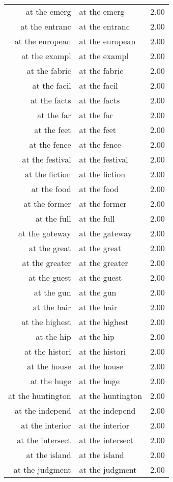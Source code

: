 \begin{table}[ht]
\begin{tabular}{rlr}
  at the emerg & at the emerg & 2.00 \\ 
  at the entranc & at the entranc & 2.00 \\ 
  at the european & at the european & 2.00 \\ 
  at the exampl & at the exampl & 2.00 \\ 
  at the fabric & at the fabric & 2.00 \\ 
  at the facil & at the facil & 2.00 \\ 
  at the facts & at the facts & 2.00 \\ 
  at the far & at the far & 2.00 \\ 
  at the feet & at the feet & 2.00 \\ 
  at the fence & at the fence & 2.00 \\ 
  at the festival & at the festival & 2.00 \\ 
  at the fiction & at the fiction & 2.00 \\ 
  at the food & at the food & 2.00 \\ 
  at the former & at the former & 2.00 \\ 
  at the full & at the full & 2.00 \\ 
  at the gateway & at the gateway & 2.00 \\ 
  at the great & at the great & 2.00 \\ 
  at the greater & at the greater & 2.00 \\ 
  at the guest & at the guest & 2.00 \\ 
  at the gun & at the gun & 2.00 \\ 
  at the hair & at the hair & 2.00 \\ 
  at the highest & at the highest & 2.00 \\ 
  at the hip & at the hip & 2.00 \\ 
  at the histori & at the histori & 2.00 \\ 
  at the house & at the house & 2.00 \\ 
  at the huge & at the huge & 2.00 \\ 
  at the huntington & at the huntington & 2.00 \\ 
  at the independ & at the independ & 2.00 \\ 
  at the interior & at the interior & 2.00 \\ 
  at the intersect & at the intersect & 2.00 \\ 
  at the island & at the island & 2.00 \\ 
  at the judgment & at the judgment & 2.00 \\ 

\end{tabular}
\end{table}
